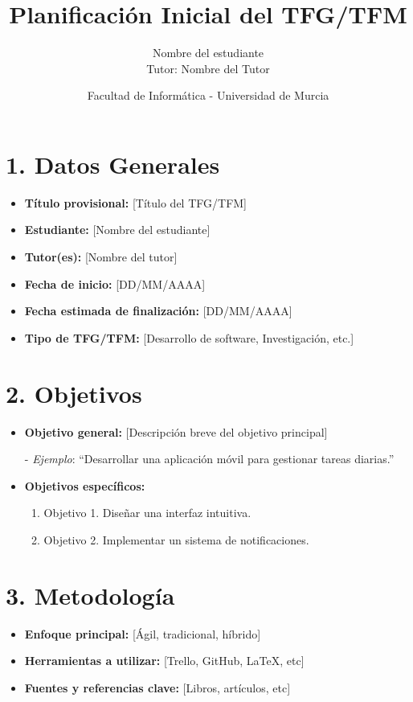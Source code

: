 \documentclass[12pt, a4paper]{article}
\title{\textbf{Planificación Inicial del TFG/TFM}}
\author{Nombre del estudiante \\ Tutor: Nombre del Tutor}
\date{Facultad de Informática - Universidad de Murcia}
\begin{document}
\maketitle

\section*{1. Datos Generales}
\begin{itemize}
    \item \textbf{Título provisional:} [Título del TFG/TFM]
    \item \textbf{Estudiante:} [Nombre del estudiante]
    \item \textbf{Tutor(es):} [Nombre del tutor]
    \item \textbf{Fecha de inicio:} [DD/MM/AAAA]
    \item \textbf{Fecha estimada de finalización:} [DD/MM/AAAA]
    \item \textbf{Tipo de TFG/TFM:} [Desarrollo de software, Investigación, etc.]
\end{itemize}

\section*{2. Objetivos}
\begin{itemize}
    \item \textbf{Objetivo general:} [Descripción breve del objetivo principal]
        \begin{itemize}
            - \textit{Ejemplo}: “Desarrollar una aplicación móvil para gestionar tareas diarias.” 
        \end{itemize}
    \item \textbf{Objetivos específicos:}
    \begin{enumerate}
        \item Objetivo 1. Diseñar una interfaz intuitiva.
        \item Objetivo 2. Implementar un sistema de notificaciones.
    \end{enumerate}
\end{itemize}

\section*{3. Metodología}
\begin{itemize}
    \item \textbf{Enfoque principal:} [Ágil, tradicional, híbrido]
    \item \textbf{Herramientas a utilizar:} [Trello, GitHub, LaTeX, etc]
    \item \textbf{Fuentes y referencias clave:} [Libros, artículos, etc]
\end{itemize}
\end{document}
